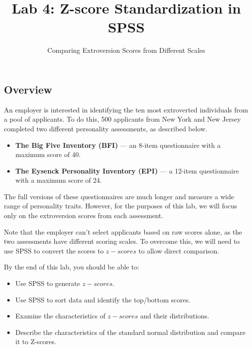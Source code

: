 \documentclass[
  letterpaper,
  DIV=11,
  numbers=noendperiod]{scrartcl}
\title{Lab 4: Z-score Standardization in SPSS}
\subtitle{Comparing Extroversion Scores from Different Scales}
\author{}
\date{}
\providecommand{\tightlist}{%
  \setlength{\itemsep}{0pt}\setlength{\parskip}{0pt}}\usepackage{longtable,booktabs,array}
\begin{document}
\maketitle


\subsection{Overview}\label{overview}

An employer is interested in identifying the ten most extroverted
individuals from a pool of applicants. To do this, 500 applicants from
New York and New Jersey completed two different personality assessments,
as described below.

\begin{itemize}
\tightlist
\item
  \textbf{The Big Five Inventory (BFI)} --- an 8-item questionnaire with
  a maximum score of 40.
\item
  \textbf{The Eysenck Personality Inventory (EPI)} --- a 12-item
  questionnaire with a maximum score of 24.
\end{itemize}

The full versions of these questionnaires are much longer and measure a
wide range of personality traits. However, for the purposes of this lab,
we will focus only on the extroversion scores from each assessment.

Note that the employer can't select applicants based on raw scores
alone, as the two assessments have different scoring scales. To overcome
this, we will need to use SPSS to convert the scores to \(z-scores\) to
allow direct comparison.

\begin{tcolorbox}[enhanced jigsaw, opacityback=0, coltitle=black, title=\textcolor{quarto-callout-note-color}{\faInfo}\hspace{0.5em}{Learning Objectives}, titlerule=0mm, rightrule=.15mm, toprule=.15mm, opacitybacktitle=0.6, colbacktitle=quarto-callout-note-color!10!white, colback=white, bottomtitle=1mm, arc=.35mm, toptitle=1mm, bottomrule=.15mm, colframe=quarto-callout-note-color-frame, breakable, leftrule=.75mm, left=2mm]

By the end of this lab, you should be able to:

\begin{itemize}
\tightlist
\item
  Use SPSS to generate \(z-scores\).
\item
  Use SPSS to sort data and identify the top/bottom scores.
\item
  Examine the characteristics of \(z-scores\) and their distributions.
\item
  Describe the characteristics of the standard normal distribution and
  compare it to Z-scores.
\end{itemize}

\end{tcolorbox}
\end{document}
